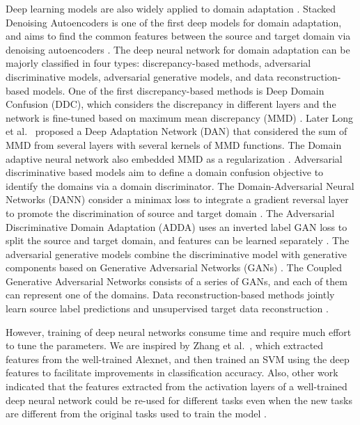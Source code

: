 \documentclass[10pt, conference, compsocconf]{IEEEtran}
\begin{document}
Deep learning models are also widely applied to domain adaptation
\cite{tzeng2014deep,sun2016deep,tzeng2017adversarial,long2017deep,jiang2017integration,chen2018joint,zhang2018collaborative,chen2018joint}. Stacked Denoising Autoencoders is one of the first deep models for domain adaptation, and aims to find the common features between the source and target domain via denoising autoencoders \cite{vincent2008extracting}. The deep neural network for domain adaptation can be majorly classified in four types: discrepancy-based methods, adversarial discriminative models, adversarial generative models, and data reconstruction-based models. One of the first discrepancy-based methods is Deep Domain Confusion (DDC), which considers the discrepancy in different layers and the network is fine-tuned based on maximum mean discrepancy (MMD) \cite{tzeng2014deep}. Later Long et al.~\cite{long2015learning} proposed a Deep Adaptation Network (DAN) that considered the sum of MMD from several layers with several 
kernels of MMD functions. The Domain adaptive neural network also embedded MMD as a regularization \cite{ghifary2015domain}. Adversarial discriminative based models aim to define a domain confusion objective to identify the domains via a domain discriminator. The Domain-Adversarial Neural Networks (DANN) consider a minimax loss to integrate a gradient reversal layer to promote the discrimination of source and target domain \cite{ganin2016domain}.
The Adversarial Discriminative Domain Adaptation (ADDA) uses an inverted label GAN loss to split the source and target domain, and features can be learned separately \cite{tzeng2017adversarial}. The adversarial generative models combine the discriminative model with generative components based on Generative Adversarial Networks (GANs) \cite{goodfellow2014generative}.  The Coupled Generative Adversarial Networks \cite{liu2016coupled} consists of a series of GANs, and each of them can represent one of the domains. Data reconstruction-based methods jointly learn source label predictions and unsupervised target data reconstruction \cite{bousmalis2016domain}. 


However, training of deep neural networks consume time and require much effort to tune the parameters. We are inspired by Zhang et al.~\cite{zhang2018automated}, which extracted features from the well-trained Alexnet, and then trained an SVM using the deep features to facilitate improvements in classification accuracy. Also, other work indicated that the features extracted from the activation layers of a well-trained deep neural network could be re-used for different tasks even when the new tasks are different from the original tasks used to train the model \cite{donahue2014decaf}. 
\end{document}
